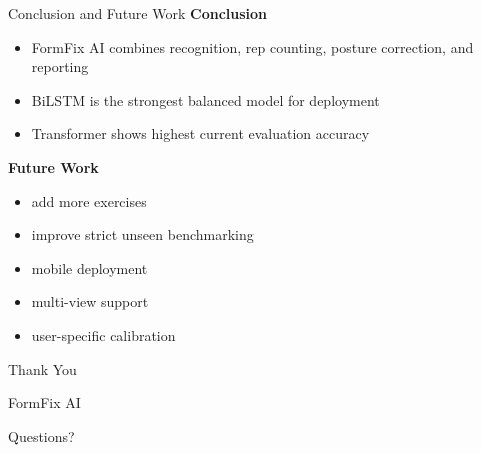 \documentclass[aspectratio=169]{beamer}
\begin{document}
\begin{frame}{Conclusion and Future Work}
\small
\textbf{Conclusion}
\begin{itemize}
  \item FormFix AI combines recognition, rep counting, posture correction, and reporting
  \item BiLSTM is the strongest balanced model for deployment
  \item Transformer shows highest current evaluation accuracy
\end{itemize}

\vspace{0.25cm}
\textbf{Future Work}
\begin{itemize}
  \item add more exercises
  \item improve strict unseen benchmarking
  \item mobile deployment
  \item multi-view support
  \item user-specific calibration
\end{itemize}
\end{frame}

\begin{frame}
  \centering
  \Huge Thank You

  \vspace{0.4cm}
  \Large FormFix AI

  \vspace{0.2cm}
  \small Questions?
\end{frame}
\end{document}
